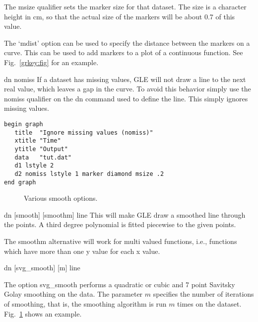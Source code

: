 \begin{commanddescription}
The {\sf msize} qualifier sets the marker size for that dataset. The size is a character height in cm, so that the actual size of the markers will be about 0.7 of this value.

The `{\sf mdist}' option can be used to specify the distance between the markers on a curve. This can be used to add markers to a plot of a continuous function. See Fig.~\ref{grkey:fig} for an example.


\item[{\sf dn nomiss}  ]
If a dataset has missing values, GLE will not draw a line to the next
real value, which leaves a gap in the curve.  To avoid this
behavior simply use the {\sf nomiss} qualifier on the {\sf dn} command
used to define the line. This simply ignores missing values.

\begin{minipage}[c]{8cm}
\begin{Verbatim}
begin graph
   title  "Ignore missing values (nomiss)"
   xtitle "Time"
   ytitle "Output"
   data   "tut.dat"
   d1 lstyle 2
   d2 nomiss lstyle 1 marker diamond msize .2
end graph
\end{Verbatim}
\end{minipage}
\hfill
\begin{minipage}[c]{7cm}
\mbox{}
\end{minipage}

\begin{figure}[tb]
\centering

\caption{\label{smooth:fig}Various smooth options.}
\end{figure}

\item[{\sf dn [smooth] [smoothm] line}]
  
This will make GLE draw a smoothed line through the points.
A third degree polynomial is fitted piecewise to the given points.

The {\sf smoothm} alternative will work for multi valued functions,
i.e., functions which have more than one y value for each x value.

\item[{\sf dn [svg\_smooth] [m] line}]

The option {\sf svg\_smooth} performs a quadratic or cubic and 7 point Savitsky Golay smoothing on the data. The parameter $m$ specifies the number of iterations of smoothing, that is, the smoothing algorithm is run $m$ times on the dataset. Fig.~\ref{smooth:fig} shows an example.


\end{commanddescription}
